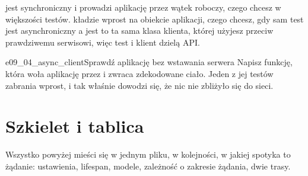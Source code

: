
\noindent
{} jest synchroniczny i prowadzi aplikację przez wątek
roboczy, czego chcesz w większości testów.  kładzie
 wprost na obiekcie aplikacji, czego chcesz, gdy sam
test jest asynchroniczny \dash{} a jest to ta sama klasa klienta, której użyjesz
przeciw prawdziwemu serwisowi, więc test i klient dzielą API.

\begin{exercise}{e09_04_async_client}{Sprawdź aplikację bez wstawania serwera}
Napisz funkcję, która woła aplikację przez  i zwraca
zdekodowane ciało. Jeden z jej testów zabrania  wprost, i
tak właśnie dowodzi się, że nic nie zbliżyło się do sieci.
\end{exercise}

\section{Szkielet i tablica}
\label{sec:ch09-skeleton}

Wszystko powyżej mieści się w jednym pliku, w kolejności, w jakiej spotyka to
żądanie: ustawienia, lifespan, modele, zależność o zakresie żądania, dwie
trasy.


